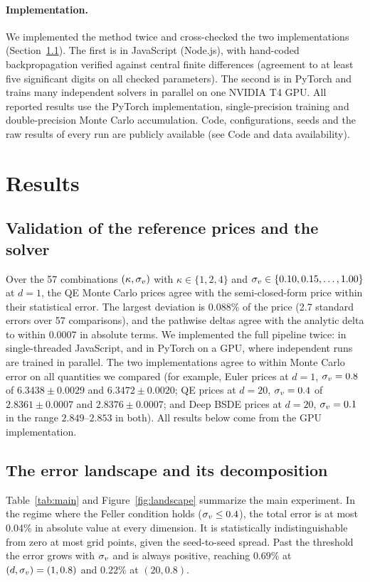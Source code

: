 \paragraph{Implementation.} We implemented the method twice and cross-checked the two implementations (Section~\ref{sec:validation}). The first is in JavaScript (Node.js), with hand-coded backpropagation verified against central finite differences (agreement to at least five significant digits on all checked parameters). The second is in PyTorch and trains many independent solvers in parallel on one NVIDIA T4 GPU. All reported results use the PyTorch implementation, single-precision training and double-precision Monte Carlo accumulation. Code, configurations, seeds and the raw results of every run are publicly available (see Code and data availability).


\figLandscape

\section{Results}\label{sec:results}

\subsection{Validation of the reference prices and the solver}\label{sec:validation}
Over the 57 combinations $(\kappa,\sigma_v)$ with $\kappa\in\{1,2,4\}$ and $\sigma_v\in\{0.10,0.15,\dots,1.00\}$ at $d=1$, the QE Monte Carlo prices agree with the semi-closed-form price within their statistical error. The largest deviation is 0.088\% of the price (2.7 standard errors over 57 comparisons), and the pathwise deltas agree with the analytic delta to within 0.0007 in absolute terms. We implemented the full pipeline twice: in single-threaded JavaScript, and in PyTorch on a GPU, where independent runs are trained in parallel. The two implementations agree to within Monte Carlo error on all quantities we compared (for example, Euler prices at $d=1$, $\sigma_v=0.8$ of $6.3438\pm0.0029$ and $6.3472\pm0.0020$; QE prices at $d=20$, $\sigma_v=0.4$ of $2.8361\pm0.0007$ and $2.8376\pm0.0007$; and Deep BSDE prices at $d=20$, $\sigma_v=0.1$ in the range $2.849$--$2.853$ in both). All results below come from the GPU implementation.

\subsection{The error landscape and its decomposition}\label{sec:landscape}
Table~\ref{tab:main} and Figure~\ref{fig:landscape} summarize the main experiment. In the regime where the Feller condition holds ($\sigma_v\le0.4$), the total error is at most 0.04\% in absolute value at every dimension. It is statistically indistinguishable from zero at most grid points, given the seed-to-seed spread. Past the threshold the error grows with $\sigma_v$ and is always positive, reaching $0.69\%$ at $(d,\sigma_v)=(1,0.8)$ and $0.22\%$ at $(20,0.8)$.

